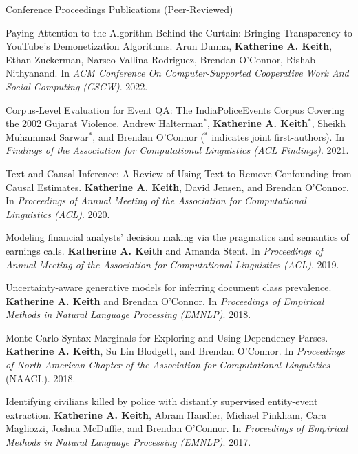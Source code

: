 \documentclass{resume} %
\begin{document}
\begin{rSection}{Conference Proceedings Publications (Peer-Reviewed)}
\begin{etaremune}

\item Paying Attention to the Algorithm Behind the Curtain: Bringing Transparency to YouTube's Demonetization Algorithms.
    Arun Dunna, \textbf{Katherine A. Keith}, Ethan Zuckerman, Narseo Vallina-Rodriguez, Brendan O'Connor, Rishab Nithyanand. 
    In \emph{ACM Conference On Computer-Supported Cooperative Work And Social Computing (CSCW)}. 2022. 

\item Corpus-Level Evaluation for Event QA: The IndiaPoliceEvents Corpus Covering the 2002 Gujarat Violence. Andrew Halterman$^*$, \textbf{Katherine A. Keith}$^*$, Sheikh Muhammad Sarwar$^*$, and Brendan O'Connor ($^*$ indicates joint first-authors).  In \emph{Findings of the Association for Computational Linguistics (ACL Findings)}. 2021.

\item Text and Causal Inference: A Review of Using Text to Remove Confounding from Causal Estimates. \textbf{Katherine A. Keith}, David Jensen, and Brendan O'Connor. In \emph{Proceedings of Annual Meeting of the Association for Computational Linguistics (ACL)}. 2020.  

\item Modeling financial analysts' decision making via the pragmatics and semantics of earnings calls. 
\textbf{Katherine A. Keith} and Amanda Stent. 
In \emph{Proceedings of Annual Meeting of the Association for Computational Linguistics (ACL)}.  2019. 

\item Uncertainty-aware generative models for inferring document class prevalence.
\textbf{Katherine A. Keith} and Brendan O'Connor. 
In \emph{Proceedings of Empirical Methods in Natural Language Processing (EMNLP)}. 2018. 

\item Monte Carlo Syntax Marginals for Exploring and Using Dependency Parses.
\textbf{Katherine A. Keith}, Su Lin Blodgett, and Brendan O'Connor.
In \emph{Proceedings of North American Chapter of the Association for Computational Linguistics} (NAACL). 2018.

\item Identifying civilians killed by police with distantly supervised entity-event extraction. 
\textbf{Katherine A. Keith}, Abram Handler, Michael Pinkham, Cara Magliozzi, Joshua McDuffie, and Brendan O'Connor. In \emph{Proceedings of Empirical Methods in Natural Language Processing (EMNLP)}. 2017. 

\end{etaremune}
\end{rSection}
\end{document}
